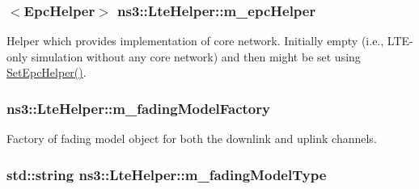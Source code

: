 \subsubsection[{\texorpdfstring{m\+\_\+epc\+Helper}{m_epcHelper}}]{$<${\bf Epc\+Helper}$>$ ns3\+::\+Lte\+Helper\+::m\+\_\+epc\+Helper\hspace{0.3cm}{\ttfamily [private]}}\hypertarget{classns3_1_1LteHelper_aeec42671d76d5bd719b37d77bfd27633}{}\label{classns3_1_1LteHelper_aeec42671d76d5bd719b37d77bfd27633}
Helper which provides implementation of core network. Initially empty (i.\+e., L\+T\+E-\/only simulation without any core network) and then might be set using \hyperlink{classns3_1_1LteHelper_a324079a1ccd54ce949786b83d6b95915}{Set\+Epc\+Helper()}. 
\subsubsection[{\texorpdfstring{m\+\_\+fading\+Model\+Factory}{m_fadingModelFactory}}]{ ns3\+::\+Lte\+Helper\+::m\+\_\+fading\+Model\+Factory\hspace{0.3cm}{\ttfamily [private]}}\hypertarget{classns3_1_1LteHelper_afd0de2f516f15d3a7be64f0ca7e7b7fc}{}\label{classns3_1_1LteHelper_afd0de2f516f15d3a7be64f0ca7e7b7fc}


Factory of fading model object for both the downlink and uplink channels. 

\subsubsection[{\texorpdfstring{m\+\_\+fading\+Model\+Type}{m_fadingModelType}}]{\setlength{\rightskip}{0pt plus 5cm}std\+::string ns3\+::\+Lte\+Helper\+::m\+\_\+fading\+Model\+Type\hspace{0.3cm}{\ttfamily [private]}}\hypertarget{classns3_1_1LteHelper_a33824762076dc0f25e054347b153f255}{}\label{classns3_1_1LteHelper_a33824762076dc0f25e054347b153f255}


